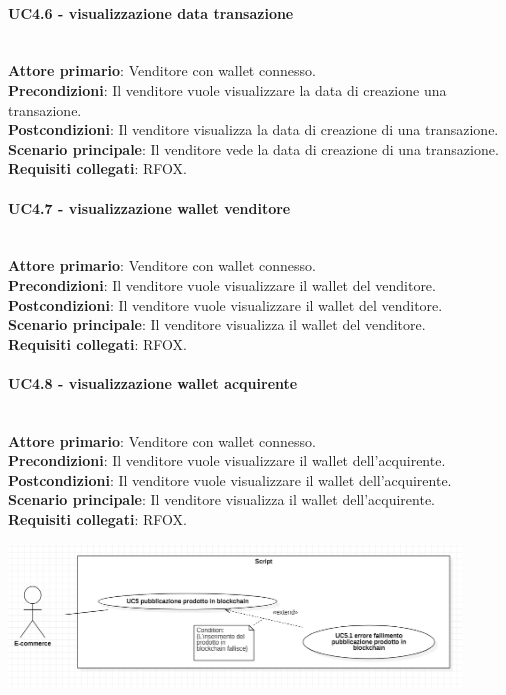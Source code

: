 \documentclass[a4paper, 12pt]{article}
\begin{document}
\paragraph{UC4.6 - visualizzazione data transazione}\\
\textbf{Attore primario}: Venditore con wallet connesso.\\
\textbf{Precondizioni}: Il venditore vuole visualizzare la data di creazione una transazione.\\
\textbf{Postcondizioni}: Il venditore visualizza la data di creazione di una transazione.\\
\textbf{Scenario principale}: Il venditore vede la data di creazione di una transazione.\\
\textbf{Requisiti collegati}: RFOX.

\paragraph{UC4.7 - visualizzazione wallet venditore}\\
\textbf{Attore primario}: Venditore con wallet connesso.\\
\textbf{Precondizioni}: Il venditore vuole visualizzare il wallet del venditore.\\
\textbf{Postcondizioni}: Il venditore vuole visualizzare il wallet del venditore.\\
\textbf{Scenario principale}: Il venditore visualizza il wallet del venditore.\\
\textbf{Requisiti collegati}: RFOX.

\paragraph{UC4.8 - visualizzazione wallet acquirente}\\
\textbf{Attore primario}: Venditore con wallet connesso.\\
\textbf{Precondizioni}: Il venditore vuole visualizzare il wallet dell'acquirente.\\
\textbf{Postcondizioni}: Il venditore vuole visualizzare il wallet dell'acquirente.\\
\textbf{Scenario principale}: Il venditore visualizza il wallet dell'acquirente.\\
\textbf{Requisiti collegati}: RFOX.

\includegraphics[width=0.9\textwidth]{UC_script}
\end{document}
